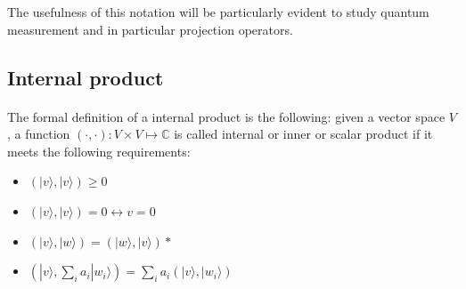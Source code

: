 \documentclass[a4paper,10pt]{article}
\newcommand{\from}[2]{{\bf[{\sc from #1:} #2]}}
\begin{document}






The usefulness of this notation will be particularly evident to study quantum measurement and in particular projection operators.

\subsection{Internal product}

\paragraph{} The formal definition of a internal product is the following: given a vector space $V$, a function $(\cdot, \cdot): V \times V \mapsto \mathbb{C}$ is called internal or inner or scalar product if it meets the following requirements:
\begin{itemize}
    \item $(|v\rangle, |v\rangle) \geq 0$
    \item $(|v\rangle, |v\rangle) = 0 \leftrightarrow v = 0$
    \item $(|v\rangle, |w\rangle) = (|w\rangle, |v\rangle)*$
    \item $(|v\rangle, \sum\nolimits_{i}a_i|w_i\rangle) = \sum\nolimits_{i}a_i(|v\rangle, |w_i\rangle)$
\end{itemize}
\end{document}
